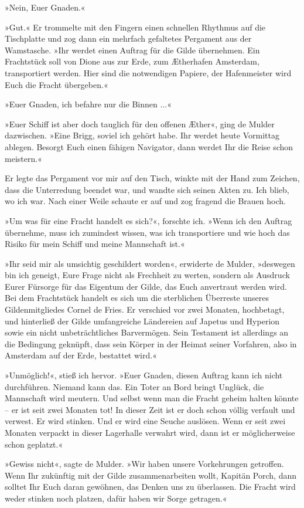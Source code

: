 »Nein, Euer Gnaden.«

»Gut.« Er trommelte mit den Fingern einen schnellen Rhythmus auf
die Tischplatte und zog dann ein mehrfach gefaltetes Pergament aus
der Wamstasche. »Ihr werdet einen Auftrag für die Gilde übernehmen.
Ein Frachtstück soll von Dione aus zur Erde, zum Ætherhafen
Amsterdam, transportiert werden. Hier sind die notwendigen Papiere,
der Hafenmeister wird Euch die Fracht übergeben.«

»Euer Gnaden, ich befahre nur die Binnen ...«

»Euer Schiff ist aber doch tauglich für den offenen Æther«, ging de
Mulder dazwischen. »Eine Brigg, soviel ich gehört habe. Ihr werdet
heute Vormittag ablegen. Besorgt Euch einen fähigen Navigator, dann
werdet Ihr die Reise schon meistern.«

Er legte das Pergament vor mir auf den Tisch, winkte mit der Hand
zum Zeichen, dass die Unterredung beendet war, und wandte sich
seinen Akten zu. Ich blieb, wo ich war. Nach einer Weile schaute er
auf und zog fragend die Brauen hoch.

»Um was für eine Fracht handelt es sich?«, forschte ich. »Wenn ich
den Auftrag übernehme, muss ich zumindest wissen, was ich
transportiere und wie hoch das Risiko für mein Schiff und meine
Mannschaft ist.«

»Ihr seid mir als umsichtig geschildert worden«, erwiderte de
Mulder, »deswegen bin ich geneigt, Eure Frage nicht als Frechheit
zu werten, sondern als Ausdruck Eurer Fürsorge für das Eigentum der
Gilde, das Euch anvertraut werden wird. Bei dem Frachtstück handelt
es sich um die sterblichen Überreste unseres Gildenmitgliedes
Cornel de Fries. Er verschied vor zwei Monaten, hochbetagt, und
hinterließ der Gilde umfangreiche Ländereien auf Japetus und
Hyperion sowie ein nicht unbeträchtliches Barvermögen. Sein
Testament ist allerdings an die Bedingung geknüpft, dass sein
Körper in der Heimat seiner Vorfahren, also in Amsterdam auf der
Erde, bestattet wird.«

»Unmöglich!«, stieß ich hervor. »Euer Gnaden, diesen Auftrag kann
ich nicht durchführen. Niemand kann das. Ein Toter an Bord bringt
Unglück, die Mannschaft wird meutern. Und selbst wenn man die
Fracht geheim halten könnte – er ist seit zwei Monaten tot! In
dieser Zeit ist er doch schon völlig verfault und verwest. Er wird
stinken. Und er wird eine Seuche auslösen. Wenn er seit zwei
Monaten verpackt in dieser Lagerhalle verwahrt wird, dann ist er
möglicherweise schon geplatzt.«

»Gewiss nicht«, sagte de Mulder. »Wir haben unsere Vorkehrungen
getroffen. Wenn Ihr zukünftig mit der Gilde zusammenarbeiten wollt,
Kapitän Porch, dann solltet Ihr Euch daran gewöhnen, das Denken uns
zu überlassen. Die Fracht wird weder stinken noch platzen, dafür
haben wir Sorge getragen.«

